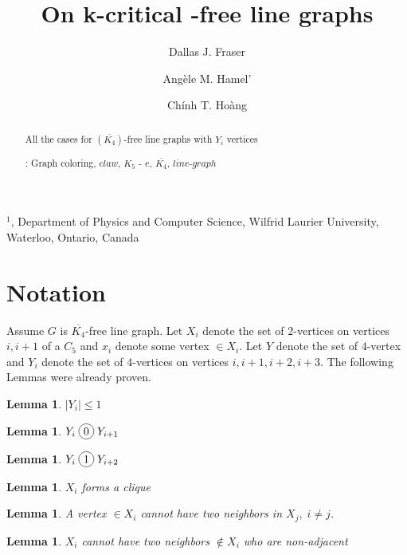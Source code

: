 \documentclass[12pt]{article}
\title{On k-critical {\FAM}-free line graphs}
\author{
	Dallas J. Fraser\inst{1}
	\and Ang\`ele M. Hamel'\inst{1}
	\and Ch\'inh T. Ho\`ang\inst{1}
}
\newcommand*\circled[1]{\tikz[baseline=(char.base)]{
            \node[shape=circle,draw,inner sep=2pt] (char) {#1};}}
\newtheorem{Lemma}[Theorem]{Lemma}
\def\inst#1{$^{#1}$}
\begin{document}
\maketitle

\begin{center}
{\footnotesize

\inst{1}, Department of Physics and Computer Science, Wilfrid Laurier
University, \\Waterloo, Ontario, Canada}

\end{center}

\begin{abstract}
All the cases for $(\overline{K_4})$-free line graphs with $Y_i$ vertices

: Graph coloring, $claw$, $K_5$ - $e$, $\overline{K_4}$, $line$-$graph$ 
\end{abstract}


\section{Notation}\label{sec:intro}
Assume $G$ is $\overline{K_4}$-free line graph. Let $X_i$ denote the set of $2$-vertices on vertices $i,i+1$ of a $C_5$ and $x_i$ denote some vertex $\in X_i$. Let $Y$ denote the set of $4$-vertex and $Y_i$ denote the set of $4$-vertices on vertices $i, i+1,i+2,i+3$. The following Lemmas were already proven.

\begin{Lemma}\label{lem:c5-4vertex-bounded}
$|Y_i| \leq 1$
\end{Lemma}

\begin{Lemma}\label{lem:yi-cojoins-yi1}
$Y_i \;\circled{0}\; Y_{i+1}$
\end{Lemma}

\begin{Lemma}\label{lem:yi-joins-yi2}
$Y_i \;\circled{1}\; Y_{i+2}$
\end{Lemma}

\begin{Lemma}\label{lem:xi-clique}
$X_i$ forms a clique
\end{Lemma}

\begin{Lemma}\label{lem:2xi-cojoins-xj}
A vertex $\in X_i$ cannot have two neighbors in $X_j,\; i \neq j$.
\end{Lemma}

\begin{Lemma}\label{lem:xi-neighbor-adjacent}
$X_i$ cannot have two neighbors $\not \in X_i$ who are non-adjacent
\end{Lemma}
\end{document}
